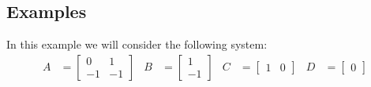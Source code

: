 \subsection{Examples}
In this example we will consider the following system:
\begin{align*}
	A &= \begin{bmatrix} 0 & 1 \\ -1 & -1 \end{bmatrix} &
	B &= \begin{bmatrix} 1 \\ -1 \end{bmatrix} &
	C &= \begin{bmatrix} 1 & 0 \end{bmatrix} &
	D &= \begin{bmatrix} 0 \end{bmatrix} 
\end{align*}

